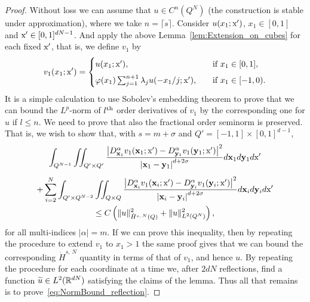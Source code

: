 \documentclass[AHL, Unicode, longabstracts, published]{cedram}
\newcommand*\R {\mathbb{R}}
\newcommand\1{{\ensuremath {\mathds 1} }}
\newcommand{\bx}{\mathbf{x}}
\newcommand{\by}{\mathbf{y}}
\newcommand{\sx}{\textup{x}}
\let\oldtilde\tilde
\renewcommand*{\tilde}[1]{\mathchoice{\widetilde{#1}}{\widetilde{#1}}{\oldtilde{#1}}{\oldtilde{#1}}}\let\oldhat\hat
\renewcommand*{\hat}[1]{\mathchoice{\widehat{#1}}{\widehat{#1}}{\oldhat{#1}}{\oldhat{#1}}}\let\oldforall\forall
\renewcommand*{\forall}{\mathrel{\oldforall}}
\begin{document}
\begin{proof}
Without loss we can assume that $u\in C^n(Q^N)$ (the construction is stable under approximation), where we take $n=\lceil s\rceil$. Consider $u(x_1; \sx')$, $x_1\in [0, 1]$ and $\sx'\in [0, 1]^{dN-1}$. And apply the above Lemma~\ref{lem:Extension_on_cubes} for each fixed $\sx'$, that is, we define $v_1$ by
\begin{equation*}
v_1(x_1; \sx')=
\begin{cases}
u(x_1; \sx'), \quad &\text{if } x_1\in [0, 1],\\[0.5em]
\varphi(x_1)\sum_{j=1}^{n+1} \lambda_j u(-x_1/j; \sx'), \quad &\text{if } x_1\in [-1, 0).
\end{cases}
\end{equation*}
It is a simple calculation to use Sobolev's embedding theorem to prove that we can bound the $L^p$-norm of $l^{\rm th}$ order derivatives of $v_1$ by the corresponding one for $u$ if $l\leq n$. We need to prove that also the fractional order seminorm is preserved. That is, we wish to show that, with $s=m+\sigma$ and $Q'=[-1, 1]\times [0, 1]^{d-1}$,
\begin{multline}\label{eq:NormBound_reflection}
\int_{Q^{N-1}} \iint_{Q'\times Q'} \frac{\left|D^\alpha_{\bx_1} v_1(\bx_1;\sx')-D^\alpha_{\by_1} v_1(\by_1; \sx')\right|^2}{\left|\bx_1-\by_1\right|^{d+2\sigma}}d\bx_1 d\by_1 d\sx'\\[5pt]
+\sum_{i=2}^N\int_{Q'\times Q^{N-2}}\iint_{Q\times Q} \frac{\left|D^\alpha_{\bx_i} v_1(\bx_i;\sx')-D^\alpha_{\by_i} v_1(\by_i; \sx')\right|^2}{\left|\bx_i-\by_i\right|^{d+2\sigma}}d\bx_i d\by_i d\sx'\\
\leq C \left(\|u\|_{\dot{H}^{s,\,N}(Q)}^2+ \|u\|_{L^2(Q^N)}^2\right),
\end{multline}
for all multi-indices $|\alpha|=m$. If we can prove this inequality, then by repeating the procedure to extend $v_1$ to $x_1>1$ the same proof gives that we can bound the corresponding $\dot{H}^{s,\,N}$ quantity in terms of that of $v_1$, and hence $u$. By repeating the procedure for each coordinate at a time we, after $2dN$ reflections, find a function $\tilde u\in L^2(\R^{dN})$ satisfying the claims of the lemma. Thus all that remains is to prove~\eqref{eq:NormBound_reflection}.



\end{proof}
\end{document}
